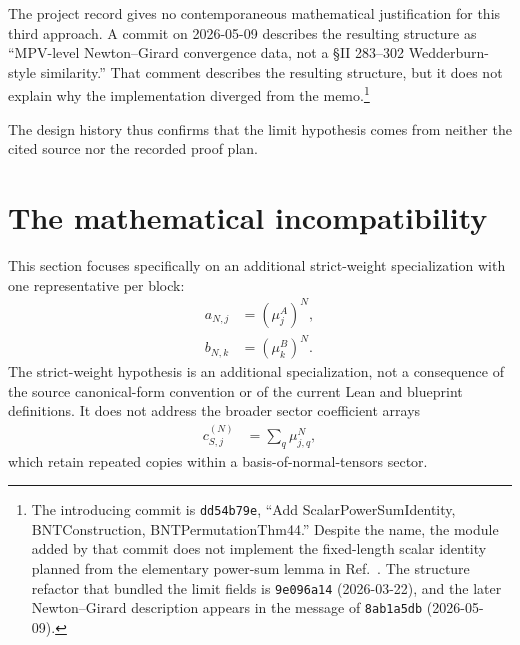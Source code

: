 \documentclass{article}
\begin{document}
The project record gives no contemporaneous mathematical justification for
this third approach. A commit on 2026-05-09 describes the resulting structure
as ``MPV-level Newton--Girard convergence data, not a \S II 283--302
Wedderburn-style similarity.'' That comment describes the resulting structure,
but it does not explain why the implementation diverged from the
memo.\footnote{%
    The introducing commit is \texttt{dd54b79e}, ``Add ScalarPowerSumIdentity,
    BNTConstruction, BNTPermutationThm44.'' Despite the name, the
     module added by that commit does not
    implement the fixed-length scalar identity planned from the elementary
    power-sum lemma in Ref.~\cite{Cirac2016MPDO_arXiv}. The structure refactor
    that bundled the limit fields is \texttt{9e096a14} (2026-03-22), and the
    later Newton--Girard description appears in the message of
    \texttt{8ab1a5db} (2026-05-09).}

The design history thus confirms that the limit hypothesis comes from neither
the cited source nor the recorded proof plan.

\section{The mathematical incompatibility}

This section focuses specifically on an additional strict-weight
specialization with one representative per block:
\begin{align}
    a_{N,j}
        &= (\mu_j^A)^N,
    \label{eq:cpsv16_cf_normalization_and_proportional_comparison_specialized_a_array}\\
    b_{N,k}
        &= (\mu_k^B)^N.
    \label{eq:cpsv16_cf_normalization_and_proportional_comparison_specialized_b_array}
\end{align}
The strict-weight hypothesis is an additional specialization, not a consequence
of the source canonical-form convention or of the current Lean and blueprint
definitions.
It does not address the broader sector coefficient arrays
\begin{align}
    c_{S,j}^{(N)}
        &= \sum_q \mu_{j,q}^N,
    \label{eq:cpsv16_cf_normalization_and_proportional_comparison_sector_coefficient_array}
\end{align}
which retain repeated copies within a basis-of-normal-tensors sector.
\end{document}
